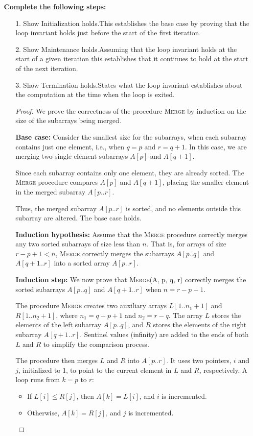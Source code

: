 \documentclass[12pt]{article}
\begin{document}
{\bf Complete the following steps:}
\begin{itemize}
\item[1.]   Show Initialization holds.This establishes the base case by proving that the loop invariant holds just
before the start of the first iteration.
\item[2.]Show Maintenance  holds.Assuming that the loop invariant holds at the start of a given iteration this
establishes that it continues to hold at the start of the next iteration.

\item[3.]   Show Termination holds.States what the loop invariant establishes about the computation at the time
when the loop is exited.

\begin{proof}
We prove the correctness of the procedure \textsc{Merge} by induction on the size of the subarrays being merged.

\textbf{Base case:} Consider the smallest size for the subarrays, when each subarray contains just one element, i.e., when $q = p$ and $r = q+1$. In this case, we are merging two single-element subarrays $A[p]$ and $A[q+1]$.

Since each subarray contains only one element, they are already sorted. The \textsc{Merge} procedure compares $A[p]$ and $A[q+1]$, placing the smaller element in the merged subarray $A[p..r]$.

Thus, the merged subarray $A[p..r]$ is sorted, and no elements outside this subarray are altered. The base case holds.

\textbf{Induction hypothesis:} Assume that the \textsc{Merge} procedure correctly merges any two sorted subarrays of size less than $n$. That is, for arrays of size $r - p + 1 < n$, \textsc{Merge} correctly merges the subarrays $A[p..q]$ and $A[q+1..r]$ into a sorted array $A[p..r]$.

\textbf{Induction step:} We now prove that \textsc{Merge}(A, p, q, r) correctly merges the sorted subarrays $A[p..q]$ and $A[q+1..r]$ when $n = r - p + 1$.

The procedure \textsc{Merge} creates two auxiliary arrays $L[1..n_1+1]$ and $R[1..n_2+1]$, where $n_1 = q - p + 1$ and $n_2 = r - q$. The array $L$ stores the elements of the left subarray $A[p..q]$, and $R$ stores the elements of the right subarray $A[q+1..r]$. Sentinel values (infinity) are added to the ends of both $L$ and $R$ to simplify the comparison process.

The procedure then merges $L$ and $R$ into $A[p..r]$. It uses two pointers, $i$ and $j$, initialized to 1, to point to the current element in $L$ and $R$, respectively. A loop runs from $k = p$ to $r$:
\begin{itemize}
    \item If $L[i] \leq R[j]$, then $A[k] = L[i]$, and $i$ is incremented.
    \item Otherwise, $A[k] = R[j]$, and $j$ is incremented.
\end{itemize}


\end{proof}
\end{itemize}
\end{document}
